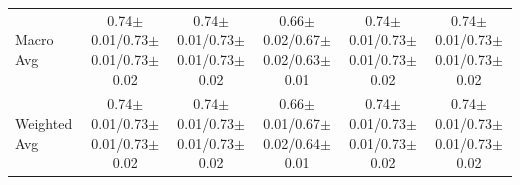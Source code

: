 \documentclass[10pt,a4paper,parskip=half-]{scrartcl}
\begin{document}
\begin{landscape}
\begin{table}[H]
{\begin{tabular}{l|cccc|cccc|cccc|cccc|cccc}
Macro Avg & \multicolumn{4}{c|}{0.74$\pm$0.01/0.73$\pm$0.01/0.73$\pm$0.02} & \multicolumn{4}{c|}{0.74$\pm$0.01/0.73$\pm$0.01/0.73$\pm$0.02} & \multicolumn{4}{c|}{0.66$\pm$0.02/0.67$\pm$0.02/0.63$\pm$0.01} & \multicolumn{4}{c|}{0.74$\pm$0.01/0.73$\pm$0.01/0.73$\pm$0.02} & \multicolumn{4}{c}{0.74$\pm$0.01/0.73$\pm$0.01/0.73$\pm$0.02} \\
Weighted Avg & \multicolumn{4}{c|}{0.74$\pm$0.01/0.73$\pm$0.01/0.73$\pm$0.02} & \multicolumn{4}{c|}{0.74$\pm$0.01/0.73$\pm$0.01/0.73$\pm$0.02} & \multicolumn{4}{c|}{0.66$\pm$0.01/0.67$\pm$0.02/0.64$\pm$0.01} & \multicolumn{4}{c|}{0.74$\pm$0.01/0.73$\pm$0.01/0.73$\pm$0.02} & \multicolumn{4}{c}{0.74$\pm$0.01/0.73$\pm$0.01/0.73$\pm$0.02} \\
\bottomrule
\end{tabular}}
\end{table}


\end{landscape}
\end{document}
